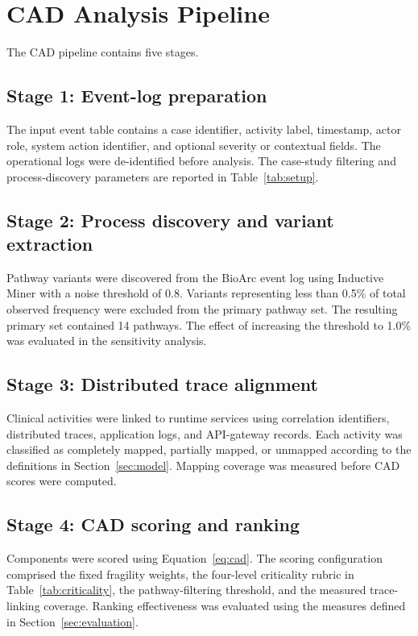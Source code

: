 \documentclass[english,preprint]{elsarticle}
\newcommand{\CAD}{\textsc{CAD}\xspace}
\begin{document}
\section{CAD Analysis Pipeline}\label{sec:pipeline}

The \CAD pipeline contains five stages.

\subsection{Stage 1: Event-log preparation}

The input event table contains a case identifier, activity label, timestamp, actor role, system action identifier, and optional severity or contextual fields. The operational logs were de-identified before analysis. The case-study filtering and process-discovery parameters are reported in Table~\ref{tab:setup}.

\subsection{Stage 2: Process discovery and variant extraction}

Pathway variants were discovered from the BioArc event log using Inductive Miner with a noise threshold of 0.8. Variants representing less than 0.5\% of total observed frequency were excluded from the primary pathway set. The resulting primary set contained 14 pathways. The effect of increasing the threshold to 1.0\% was evaluated in the sensitivity analysis.

\subsection{Stage 3: Distributed trace alignment}

Clinical activities were linked to runtime services using correlation identifiers, distributed traces, application logs, and API-gateway records. Each activity was classified as completely mapped, partially mapped, or unmapped according to the definitions in Section~\ref{sec:model}. Mapping coverage was measured before \CAD scores were computed.

\subsection{Stage 4: CAD scoring and ranking}

Components were scored using Equation~\eqref{eq:cad}. The scoring configuration comprised the fixed fragility weights, the four-level criticality rubric in Table~\ref{tab:criticality}, the pathway-filtering threshold, and the measured trace-linking coverage. Ranking effectiveness was evaluated using the measures defined in Section~\ref{sec:evaluation}.
\end{document}
